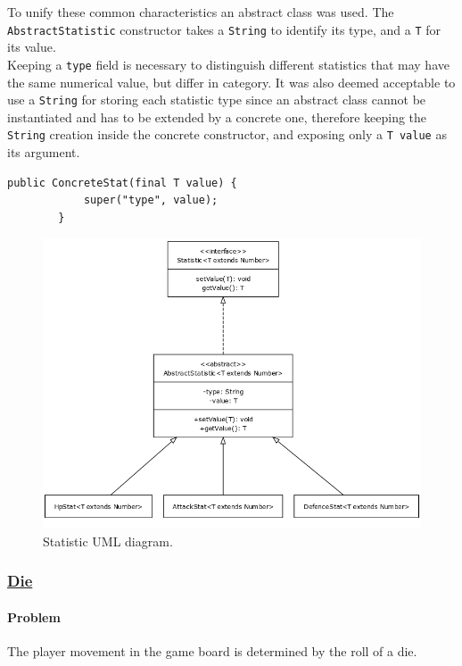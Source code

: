 \documentclass[12pt, a4paper]{report}
\theoremstyle{definition}
\begin{document}
    To unify these common characteristics an abstract class was used. The \verb|AbstractStatistic| constructor takes a \verb|String| to identify its type, and a
    \verb|T| for its value.\\
    Keeping a \verb|type| field is necessary to distinguish different statistics that may have the same numerical value, but differ in category.
    It was also deemed acceptable to use a \verb|String| for storing each statistic type since an abstract class cannot be instantiated and has to be extended by
    a concrete one, therefore keeping the \verb|String| creation inside the concrete constructor, and exposing only a \verb|T value| as its argument.

    \begin{lstlisting}[caption={Example of a concrete stat constructor.}, gobble=8]
        public ConcreteStat(final T value) {
            super("type", value);
        }
    \end{lstlisting}

    \begin{figure}[h]
    \centering{}
    \caption{Statistic UML diagram.}
    \includegraphics[width=\textwidth]{statistic_uml}
    \end{figure}

    \subsubsection{\underline{Die}}
    \paragraph{Problem}
    The player movement in the game board is determined by the roll of a die.
\end{document}
